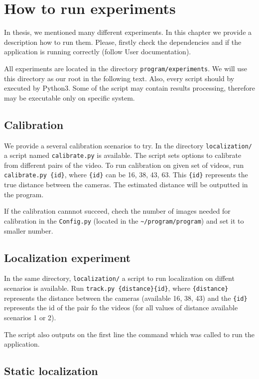 \chapter{How to run experiments}

In thesis, we mentioned many different experiments. In this chapter we provide
a description how to run them. Please, firstly check the dependencies and if
the application is running correctly (follow User documentation).

All experiments are located in the directory \texttt{program/experiments}. We
will use this directory as our root in the following text. Also, every script
should by executed by Python3. Some of the script may contain results
processing, therefore may be executable only on specific system.

\section{Calibration}

We provide a several calibration scenarios to try. In the directory
\verb+localization/+ a script named \verb+calibrate.py+ is
available. The script sets options to calibrate from different pairs of the
video. To run calibration on given set of videos, run \verb+calibrate.py {id}+,
where \verb+{id}+ can be 16, 38, 43, 63. This \verb+{id}+ represents the true
distance between the cameras. The estimated distance will be outputted in the
program.

If the calibration cannnot succeed, chech the number of images needed for
calibration in the \verb+Config.py+ (located in the \verb+~/program/program+)
and set it to smaller number.

\section{Localization experiment}

In the same directory, \verb+localization/+ a script to run
localization on diffent scenarios is available. Run \verb+track.py {distance}{id}+, 
where \verb+{distance}+ represents the distance between the cameras
(available 16, 38, 43) and the \verb+{id}+ represents the id of the pair fo the
videos (for all values of distance available scenarios 1 or 2).

The script also outputs on the first line the command which was called to run
the application.

\section{Static localization}

